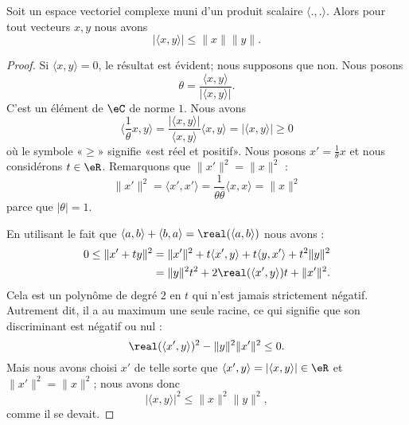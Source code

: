 \begin{theorem}
     Soit un espace vectoriel complexe muni d'un produit scalaire \( \langle ., .\rangle \). Alors pour tout vecteurs \( x,y\) nous avons
     \begin{equation}
         | \langle x, y\rangle  |\leq \| x \|\| y \|.
     \end{equation}
\end{theorem}

\begin{proof}
    Si \( \langle x, y\rangle =0\), le résultat est évident; nous supposons que non. Nous posons
    \begin{equation}
        \theta=\frac{ \langle x, y\rangle  }{ | \langle x, y\rangle  | }.
    \end{equation}
    C'est un élément de \( \eC\) de norme \( 1\). Nous avons
    \begin{equation}
        \langle \frac{1}{ \theta }x, y\rangle =\frac{ | \langle x, y\rangle  | }{ \langle x, y\rangle  }\langle x, y\rangle =| \langle x, y\rangle  |\geq 0
    \end{equation}
    où le symbole «\( \geq\)» signifie «est réel et positif». Nous posons \( x'=\frac{1}{ \theta }x\) et nous considérons \( t\in \eR\). Remarquons que \( \| x' \|^2=\| x \|^2\) :
    \begin{equation}
        \| x' \|^2=\langle x', x'\rangle =\frac{1}{ \theta\bar\theta }\langle x, x\rangle =\| x \|^2
    \end{equation}
    parce que \( | \theta |=1\).

    En utilisant le fait que \( \langle a, b\rangle +\langle b, a\rangle =\real(\langle a, b\rangle )\) nous avons :
    \begin{subequations}
        \begin{align}
            0\leq \| x'+ty \|^2&=\| x' \|^2+t\langle x', y\rangle +t\langle y, x'\rangle +t^2\| y \|^2\\
            &=\| y \|^2t^2+2\real(\langle x', y\rangle )t+\| x' \|^2.
        \end{align}
    \end{subequations}
    Cela est un polynôme de degré \( 2\) en \( t\) qui n'est jamais strictement négatif. Autrement dit, il a au maximum une seule racine, ce qui signifie que son discriminant est négatif ou nul :
    \begin{equation}
        \real(\langle x', y\rangle )^2-\| y \|^2\| x' \|^2\leq 0.
    \end{equation}
    Mais nous avons choisi \( x'\) de telle sorte que \( \langle x', y\rangle =| \langle x, y\rangle  |\in \eR\) et \( \| x' \|^2=\| x \|^2\); nous avons donc
    \begin{equation}
        | \langle x, y\rangle  |^2\leq \| x \|^2\| y \|^2,
    \end{equation}
    comme il se devait.
\end{proof}


